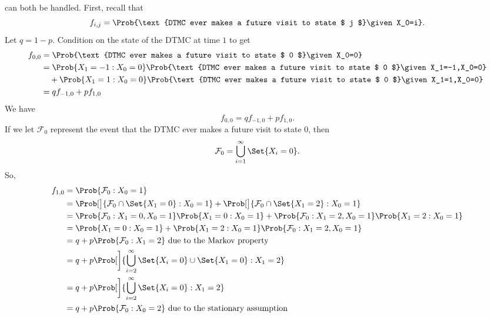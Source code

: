 \begin{Example}
    can both be handled. First, recall that
    \[ f_{i,j}=\Prob{\text{DTMC ever makes a future visit to state $ j $}\given X_0=i}. \]
    Let $ q=1-p $. Condition on the state of the DTMC at time $ 1 $ to get
    \begin{align*}
        f_{0,0}
         & =\Prob{\text{DTMC ever makes a future visit to state $ 0 $}\given X_0=0}                                    \\
         & =\Prob{X_1=-1\given X_0=0}\Prob{\text{DTMC ever makes a future visit to state $ 0 $}\given X_1=-1,X_0=0}    \\
         & \quad+\Prob{X_1=1\given X_0=0}\Prob{\text{DTMC ever makes a future visit to state $ 0 $}\given X_1=1,X_0=0} \\
         & =q f_{-1,0}+p f_{1,0}
    \end{align*}
    We have
    \begin{equation}
        \boxed{f_{0,0}=q f_{-1,0}+p f_{1,0}}.\label{eq3.5}\tag*{(3.5)}
    \end{equation} If we let $ \mathcal{F}_0 $
    represent the event that the DTMC ever makes a future visit to state $ 0 $,
    then
    \[ \mathcal{F}_0=\bigcup_{i=1}^\infty\Set{X_i=0}. \] So,
    \begin{align*}
        f_{1,0}
         & =\Prob{\mathcal{F}_0\given X_0=1}                                                                                              \\
         & =\Prob[\big]{\mathcal{F}_0\cap\Set{X_1=0}\given X_0=1}+\Prob[\big]{\mathcal{F}_0\cap\Set{X_1=2}\given X_0=1}                   \\
         & =\Prob{\mathcal{F}_0\given X_1=0,X_0=1}\Prob{X_1=0\given X_0=1}+\Prob{\mathcal{F}_0\given X_1=2,X_0=1}\Prob{X_1=2\given X_0=1} \\
         & =\Prob{X_1=0\given X_0=1}+\Prob{X_1=2\given X_0=1}\Prob{\mathcal{F}_0\given X_1=2,X_0=1}                                       \\
         & =q+p\Prob{\mathcal{F}_0\given X_1=2}\text{ due to the Markov property}                                                         \\
         & =q+p\Prob[\bigg]{\bigcup_{i=2}^\infty\Set{X_i=0}\cup \Set{X_1=0}\given X_1=2}                                                  \\
         & =q+p\Prob[\bigg]{\bigcup_{i=2}^\infty\Set{X_i=0}\given X_1=2}                                                                  \\
         & =q+p\Prob{\mathcal{F}_0\given X_0=2}\text{ due to the stationary assumption}                                                   \\

\end{align*}
\end{Example}
